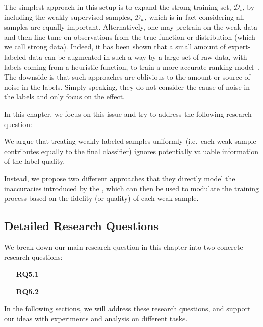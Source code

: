 The simplest approach in this setup is to expand the strong training set, $\mathcal{D}_s$, by including the weakly-supervised samples, $\mathcal{D}_w$, which is in fact considering all samples are equally important. Alternatively, one may pretrain on the weak data and then fine-tune on observations from the true function or distribution (which we call strong data). Indeed, it has been shown that a small amount of expert-labeled data can be augmented in such a way by a large set of raw data, with labels coming from a heuristic function, to train a more accurate ranking model~\citep{Dehghani:2017:SIGIR, Severyn:2015:SIGIR}.
The downside is that such approaches are oblivious to the amount or source of noise in the labels. Simply speaking, they do not consider the cause of noise in the labels and only focus on the effect. 

In this chapter, we focus on this issue and try to address the following research question:
\begin{resqbox}
\emph{}
\end{resqbox}

We argue that treating weakly-labeled samples uniformly (i.e.\ each weak sample contributes equally to the final classifier) ignores potentially valuable information of the label quality. 

Instead, we propose two different approaches that they directly model the inaccuracies introduced by the \wa, which can then be used to modulate the training process based on the fidelity (or quality) of each weak sample. 


\subsection{Detailed Research Questions}
We break down our main research question in this chapter into two concrete research questions:
\begin{resqbox}
\begin{enumerate}
\item[\textbf{RQ5.1}] \emph{}
\item[\textbf{RQ5.2}] \emph{}
\end{enumerate}
\end{resqbox}
In the following sections, we will address these research questions, and support our ideas with experiments and analysis on different tasks.

